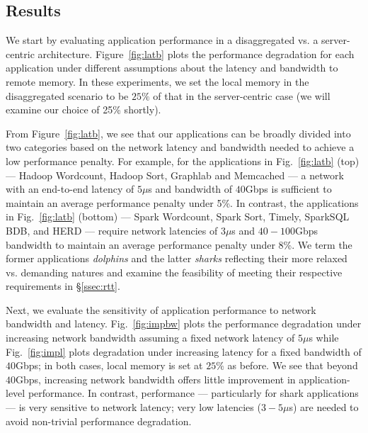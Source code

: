 \vspace{-0.1in}
\subsection{Results}
\label{ssec:rr}
\vspace{-0.05in}
We start by evaluating application performance in a disaggregated vs. a server-centric architecture. 
Figure~\ref{fig:latb} plots the performance degradation for each application under different assumptions about the latency and bandwidth to remote memory. In these experiments, we set the local memory in the disaggregated scenario to be  $25\%$ of that in the server-centric case (we will examine our choice of 25\% shortly). 

From Figure~\ref{fig:latb}, we see that our applications can be broadly divided into two categories based on the network latency and bandwidth needed to achieve a low performance penalty.
For example, for the applications in Fig.~\ref{fig:latb} (top) --- Hadoop Wordcount, Hadoop Sort, Graphlab and Memcached --- a network with an end-to-end latency of $5\mu$s and bandwidth of $40$Gbps is sufficient to maintain an average performance penalty under 5\%. 
In contrast, the applications in Fig.~\ref{fig:latb} (bottom) --- Spark Wordcount, Spark Sort, Timely, SparkSQL BDB, and HERD --- require network latencies of $3\mu$s and $40-100$Gbps bandwidth to maintain an average performance penalty under 8\%. We term the former applications {\em dolphins} and the latter {\em sharks} reflecting their more relaxed vs. demanding natures and examine the feasibility of meeting their respective requirements in \S\ref{ssec:rtt}.

Next, we evaluate the sensitivity of application performance to network bandwidth and latency. Fig.~\ref{fig:impbw} plots the performance degradation under increasing network bandwidth assuming a fixed network latency of $5\mu$s while Fig.~\ref{fig:impl} plots degradation under increasing latency for a fixed bandwidth of $40$Gbps; in both cases, local memory is set at $25\%$ as before.
We see that beyond $40$Gbps, increasing network bandwidth offers little improvement in application-level performance. 
%
%
In contrast, performance --- particularly for shark applications --- is very sensitive to network latency; very low latencies ($3-5\mu$s) are needed to avoid non-trivial performance degradation.

